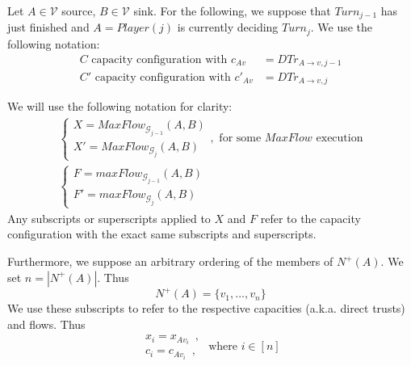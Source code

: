 Let $A \in \mathcal{V}$ source, $B \in \mathcal{V}$ sink. For the following, we suppose that $Turn_{j-1}$ has just finished
and $A = Player\left(j\right)$ is currently deciding $Turn_j$. We use the following notation:
\begin{align*}
   C \mbox{ capacity configuration with } c_{Av} &= DTr_{A \rightarrow v, j-1} \\
   C' \mbox{ capacity configuration with } c'_{Av} &= DTr_{A \rightarrow v, j}
\end{align*}

We will use the following notation for clarity:
\begin{equation*}
\begin{gathered}
  \begin{cases}
    X = MaxFlow_{\mathcal{G}_{j-1}}\left(A, B\right) \\
    X' = MaxFlow_{\mathcal{G}_j}\left(A, B\right)
  \end{cases}, \mbox{ for some } MaxFlow \mbox{ execution} \\
  \begin{cases}
    F = maxFlow_{\mathcal{G}_{j-1}}\left(A, B\right) \\
    F' = maxFlow_{\mathcal{G}_j}\left(A, B\right)
  \end{cases}
\end{gathered}
\end{equation*}
Any subscripts or superscripts applied to $X$ and $F$ refer to the capacity configuration with the exact same subscripts and
superscripts.

Furthermore, we suppose an arbitrary ordering of the members of $N^{+}\left(A\right)$. We set $n = |N^{+}\left(A\right)|$.
Thus
\begin{equation*}
   N^{+}\left(A\right) = \{v_1, ..., v_n\}
\end{equation*}
We use these subscripts to refer to the respective capacities (a.k.a. direct trusts) and flows. Thus
\begin{equation*}
   \begin{array}{l}
      x_i = x_{Av_i} \enspace, \\
      c_i = c_{Av_i} \enspace,
   \end{array}
   \mbox{ where } i \in [n]
\end{equation*}
